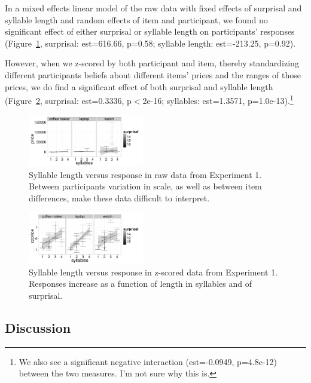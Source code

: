 \documentclass[10pt,letterpaper]{article}
\begin{document}
  In a mixed effects linear model of the raw data with fixed effects of surprisal and syllable length and random effects of item and participant, we found no significant effect of either surprisal or syllable length on participants' responses (Figure~\ref{raw-figure}, surprisal: est=616.66, p=0.58; syllable length: est=-213.25, p=0.92).
  
  However, when we z-scored by both participant and item, thereby standardizing different participants beliefs about different items' prices and the ranges of those prices, we do find a significant effect of both surprisal and syllable length (Figure~\ref{scaled-figure}, surprisal: est=0.3336, p$<$2e-16; syllables: est=1.3571, p=1.0e-13).\footnote{We also see a significant negative interaction (est=-0.0949, p=4.8e-12) between the two measures. I'm not sure why this is.}
  
  \begin{figure}[ht]
  \begin{center}
  \includegraphics[width=0.45\textwidth]{exp1-raw-syllables.png}
  \end{center}
  \caption{Syllable length versus response in raw data from Experiment 1. Between participants variation in scale, as well as between item differences, make these data difficult to interpret.} 
  \label{raw-figure}
  \end{figure}
  
  \begin{figure}[ht]
  \begin{center}
  \includegraphics[width=0.45\textwidth]{exp1-zz-syllables.png}
  \end{center}
  \caption{Syllable length versus response in z-scored data from Experiment 1. Responses increase as a function of length in syllables and of surprisal.} 
  \label{scaled-figure}
  \end{figure}
  
  \subsection{Discussion}
  
\end{document}
